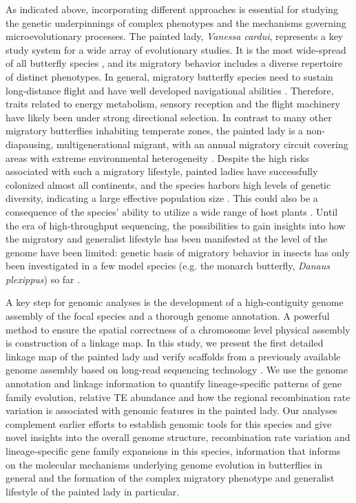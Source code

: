 \documentclass[twocolumn]{bmcart}%
\begin{document}
As indicated above, incorporating different approaches is essential for studying the genetic underpinnings of complex phenotypes and the mechanisms governing microevolutionary processes. The painted lady, \textit{Vanessa cardui}, represents a key study system for a wide array of evolutionary studies. It is the most wide-spread of all butterfly species \cite{talaveraRoundtripSaharaAfrotropical2018}, and its migratory behavior includes a diverse repertoire of distinct phenotypes. In general, migratory butterfly species need to sustain long-distance flight and have well developed navigational abilities \cite{chapmanLongrangeSeasonalMigration2015,guerra_magnetic_2014}. Therefore, traits related to energy metabolism, sensory reception and the flight machinery have likely been under strong directional selection. In contrast to many other migratory butterflies inhabiting temperate zones, the painted lady is a non-diapausing, multigenerational migrant, with an annual migratory circuit covering areas with extreme environmental heterogeneity \cite{talaveraDiscoveryMassMigration2016,menchetti_spatio-temporal_2019}. Despite the high risks associated with such a migratory lifestyle, painted ladies have successfully colonized almost all continents, and the species harbors high levels of genetic diversity, indicating a large effective population size \cite{garcia-berroGenomicDemographicInferenceinprep}. This could also be a consequence of the species’ ability to utilize a wide range of host plants \cite{celorio-manceraEvolutionaryHistoryHost2016,ackery_hostplants_1988}. Until the era of high-throughput sequencing, the possibilities to gain insights into how the migratory and generalist lifestyle has been manifested at the level of the genome have been limited: genetic basis of migratory behavior in insects has only been investigated in a few model species (e.g. the monarch butterfly, \textit{Danaus plexippus}) so far \cite{merlinGeneticsEpigeneticsAnimal2019}.

A key step for genomic analyses is the development of a high-contiguity genome assembly of the focal species and a thorough genome annotation. A powerful method to ensure the spatial correctness of a chromosome level physical assembly is construction of a linkage map. In this study, we present the first detailed linkage map of the painted lady and verify scaffolds from a previously available genome assembly based on long-read sequencing technology \cite{lohse_genome_2021}. 
We use the genome annotation and linkage information to quantify lineage-specific patterns of gene family evolution, relative TE abundance and how the regional recombination rate variation is associated with genomic features in the painted lady. Our analyses complement earlier efforts to establish genomic tools for this species
\cite{connahsTranscriptomeAnalysisPainted2016a, zhangHighQualityGenomeAssembly2021} and give novel insights into the overall genome structure, recombination rate variation and lineage-specific gene family expansions in this species, information that informs on the molecular mechanisms underlying genome evolution in butterflies in general and the formation of the complex migratory phenotype and generalist lifestyle of the painted lady in particular.
\end{document}
